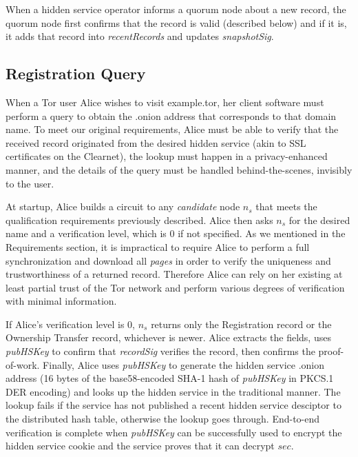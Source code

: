 When a hidden service operator informs a quorum node about a new record, the quorum node first confirms that the record is valid (described below) and if it is, it adds that record into \emph{recentRecords} and updates \emph{snapshotSig}. 











\subsection{Registration Query}


When a Tor user Alice wishes to visit example.tor, her client software must perform a query to obtain the .onion address that corresponds to that domain name. To meet our original requirements, Alice must be able to verify that the received record originated from the desired hidden service (akin to SSL certificates on the Clearnet), the lookup must happen in a privacy-enhanced manner, and the details of the query must be handled behind-the-scenes, invisibly to the user.

At startup, Alice builds a circuit to any \emph{candidate} node $ n_{s} $ that meets the qualification requirements previously described. Alice then asks $ n_{s} $ for the desired name and a verification level, which is 0 if not specified. As we mentioned in the Requirements section, it is impractical to require Alice to perform a full synchronization and download all \emph{pages} in order to verify the uniqueness and trustworthiness of a returned record. Therefore Alice can rely on her existing at least partial trust of the Tor network and perform various degrees of verification with minimal information.

If Alice's verification level is 0, $ n_{s} $ returns only the Registration record or the Ownership Transfer record, whichever is newer. Alice extracts the fields, uses \emph{pubHSKey} to confirm that \emph{recordSig} verifies the record, then confirms the proof-of-work. Finally, Alice uses \emph{pubHSKey} to generate the hidden service .onion address (16 bytes of the base58-encoded SHA-1 hash of \emph{pubHSKey} in PKCS.1 DER encoding) and looks up the hidden service in the traditional manner. The lookup fails if the service has not published a recent hidden service desciptor to the distributed hash table, otherwise the lookup goes through. End-to-end verification is complete when \emph{pubHSKey} can be successfully used to encrypt the hidden service cookie and the service proves that it can decrypt $ sec $.

